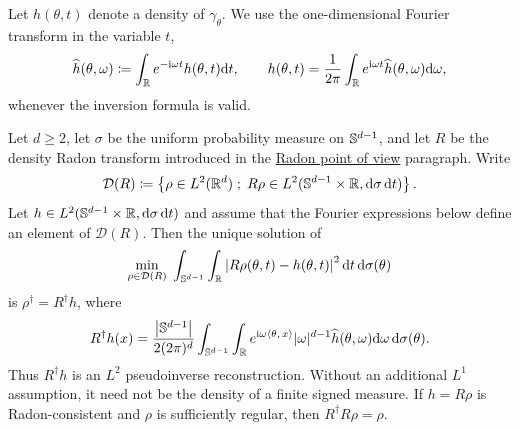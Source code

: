 Let $h(\theta,t)$ denote a density of $\gamma_\theta$. We use the one-dimensional Fourier transform in the variable $t$,
\begin{equation}\label{eq-radon-sinogram-fourier}
	\widehat h(\theta,\omega)
	\coloneqq
	\int_{\mathbb{R}}e^{-\mathrm{i}\omega t}h(\theta,t)\mathrm{d} t,
	\qquad
	h(\theta,t)
	=
	\frac{1}{2\pi}\int_{\mathbb{R}}e^{\mathrm{i}\omega t}\widehat h(\theta,\omega)\mathrm{d}\omega,
\end{equation}
whenever the inversion formula is valid.

\begin{prop}\label{prop-radon-pseudoinverse}
	Let $d\geq2$, let $\sigma$ be the uniform probability measure on $\mathbb{S}^{d-1}$, and let $R$ be the density Radon transform introduced in the \hyperref[rem-sliced-radon-viewpoint]{Radon point of view} paragraph. Write
	\[
		\mathcal D(R)
		\coloneqq
		\left\{ \rho\in L^2(\mathbb{R}^d) \;;\; R\rho\in L^2(\mathbb{S}^{d-1}\times\mathbb{R},\mathrm{d}\sigma\,\mathrm{d} t) \right\}.
	\]
	Let $h\in L^2(\mathbb{S}^{d-1}\times\mathbb{R},\mathrm{d}\sigma\,\mathrm{d} t)$ and assume that the Fourier expressions below define an element of $\mathcal D(R)$. Then the unique solution of
	\begin{equation}\label{eq-radon-least-squares}
		\underset{\rho\in\mathcal D(R)}{\min}\;
		\int_{\mathbb{S}^{d-1}}\int_{\mathbb{R}}
		\left\lvert R\rho(\theta,t)-h(\theta,t)\right\rvert^2
		\mathrm{d} t\,\mathrm{d}\sigma(\theta)
	\end{equation}
	is $\rho^\dagger=R^\dagger h$, where
	\begin{equation}\label{eq-radon-pseudoinverse}
		R^\dagger h(x)
		=
		\frac{\left\lvert\mathbb{S}^{d-1}\right\rvert}{2(2\pi)^d}
		\int_{\mathbb{S}^{d-1}}\int_{\mathbb{R}}
		e^{\mathrm{i}\omega\langle \theta,\,x\rangle}
		|\omega|^{d-1}
		\widehat h(\theta,\omega)
		\mathrm{d}\omega\,\mathrm{d}\sigma(\theta).
	\end{equation}
	Thus $R^\dagger h$ is an $L^2$ pseudoinverse reconstruction. Without an additional $L^1$ assumption, it need not be the density of a finite signed measure. If $h=R\rho$ is Radon-consistent and $\rho$ is sufficiently regular, then $R^\dagger R\rho=\rho$.
\end{prop}

